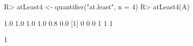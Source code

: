 \begin{Schunk}
% --begin: "quant7"
\begin{Sinput}
R> atLeast4 <- quantifier("at.least", n = 4)
R> atLeast4(A)
\end{Sinput}
\begin{Soutput}
[1] 1.0 1.0 1.0 1.0 0.8 0.0
[1] 0 0 0 1 1 1
\end{Soutput}
\begin{Soutput}
[1] 1
\end{Soutput}
%
% --end: "quant7"
\end{Schunk}
